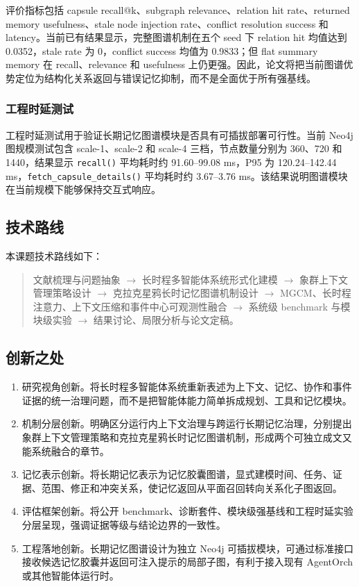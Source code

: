\documentclass[UTF8,a4paper,zihao=-4,fontset=windows]{ctexart}
\begin{document}
评价指标包括 capsule recall@k、subgraph relevance、relation hit rate、returned memory usefulness、stale node injection rate、conflict resolution success 和 latency。当前已有结果显示，完整图谱机制在五个 seed 下 relation hit 均值达到 0.0352，stale rate 为 0，conflict success 均值为 0.9833；但 flat summary memory 在 recall、relevance 和 usefulness 上仍更强。因此，论文将把当前图谱优势定位为结构化关系返回与错误记忆抑制，而不是全面优于所有强基线。

\subsubsection{工程时延测试}

工程时延测试用于验证长期记忆图谱模块是否具有可插拔部署可行性。当前 Neo4j 图规模测试包含 scale-1、scale-2 和 scale-4 三档，节点数量分别为 360、720 和 1440，结果显示 \texttt{recall()} 平均耗时约 91.60--99.08 ms，P95 为 120.24--142.44 ms，\texttt{fetch\_capsule\_details()} 平均耗时约 3.67--3.76 ms。该结果说明图谱模块在当前规模下能够保持交互式响应。

\subsection{技术路线}

本课题技术路线如下：

\begin{quote}
文献梳理与问题抽象
$\rightarrow$
长时程多智能体系统形式化建模
$\rightarrow$
象群上下文管理策略设计
$\rightarrow$
克拉克星鸦长时记忆图谱机制设计
$\rightarrow$
MGCM、长时程注意力、上下文压缩和事件中心可观测性融合
$\rightarrow$
系统级 benchmark 与模块级实验
$\rightarrow$
结果讨论、局限分析与论文定稿。
\end{quote}

\subsection{创新之处}

\begin{enumerate}[label=\arabic*.]
  \item 研究视角创新。将长时程多智能体系统重新表述为上下文、记忆、协作和事件证据的统一治理问题，而不是把智能体能力简单拆成规划、工具和记忆模块。
  \item 机制分层创新。明确区分运行内上下文治理与跨运行长期记忆治理，分别提出象群上下文管理策略和克拉克星鸦长时记忆图谱机制，形成两个可独立成文又能系统融合的章节。
  \item 记忆表示创新。将长期记忆表示为记忆胶囊图谱，显式建模时间、任务、证据、范围、修正和冲突关系，使记忆返回从平面召回转向关系化子图返回。
  \item 评估框架创新。将公开 benchmark、诊断套件、模块级强基线和工程时延实验分层呈现，强调证据等级与结论边界的一致性。
  \item 工程落地创新。长期记忆图谱设计为独立 Neo4j 可插拔模块，可通过标准接口接收候选记忆胶囊并返回可注入提示的局部子图，有利于接入现有 AgentOrch 或其他智能体运行时。
\end{enumerate}
\end{document}
